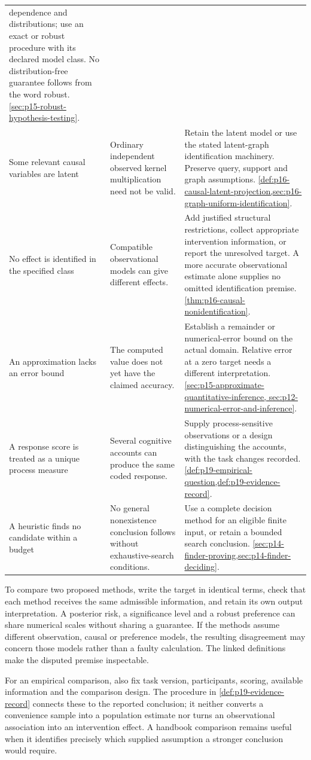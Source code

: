 \begin{longtable}{@{}p{}p{}p{}@{}}
dependence and distributions; use an exact or robust procedure with its
declared model class. No distribution-free guarantee follows from the word
robust. \cref{sec:p15-robust-hypothesis-testing}. \\
Some relevant causal variables are latent & Ordinary independent observed
kernel multiplication need not be valid. & Retain the latent model or use
the stated latent-graph identification machinery. Preserve query, support
and graph assumptions.
\cref{def:p16-causal-latent-projection,sec:p16-graph-uniform-identification}. \\
No effect is identified in the specified class & Compatible observational
models can give different effects. & Add justified structural restrictions,
collect appropriate intervention information, or report the unresolved
target. A more accurate observational estimate alone supplies no omitted
identification premise.
\cref{thm:p16-causal-nonidentification}. \\
An approximation lacks an error bound & The computed value does not yet
have the claimed accuracy. & Establish a remainder or numerical-error
bound on the actual domain. Relative error at a zero target needs a different
interpretation.
\cref{sec:p15-approximate-quantitative-inference,
sec:p12-numerical-error-and-inference}. \\
A response score is treated as a unique process measure & Several cognitive
accounts can produce the same coded response. & Supply process-sensitive
observations or a design distinguishing the accounts, with the task changes
recorded. \cref{def:p19-empirical-question,def:p19-evidence-record}. \\
A heuristic finds no candidate within a budget & No general nonexistence
conclusion follows without exhaustive-search conditions. & Use a complete
decision method for an eligible finite input, or retain a bounded search
conclusion. \cref{sec:p14-finder-proving,sec:p14-finder-deciding}. \\
\bottomrule
\end{longtable}

To compare two proposed methods, write the target in identical terms, check
that each method receives the same admissible information, and retain its
own output interpretation. A posterior risk, a significance level and a
robust preference can share numerical scales without sharing a guarantee.
If the methods assume different observation, causal or preference models,
the resulting disagreement may concern those models rather than a faulty
calculation. The linked definitions make the disputed premise inspectable.

For an empirical comparison, also fix task version, participants, scoring,
available information and the comparison design. The procedure in
\cref{def:p19-evidence-record} connects these to the reported conclusion;
it neither converts a convenience sample into a population estimate nor
turns an observational association into an intervention effect. A handbook
comparison remains useful when it identifies precisely which supplied
assumption a stronger conclusion would require.
